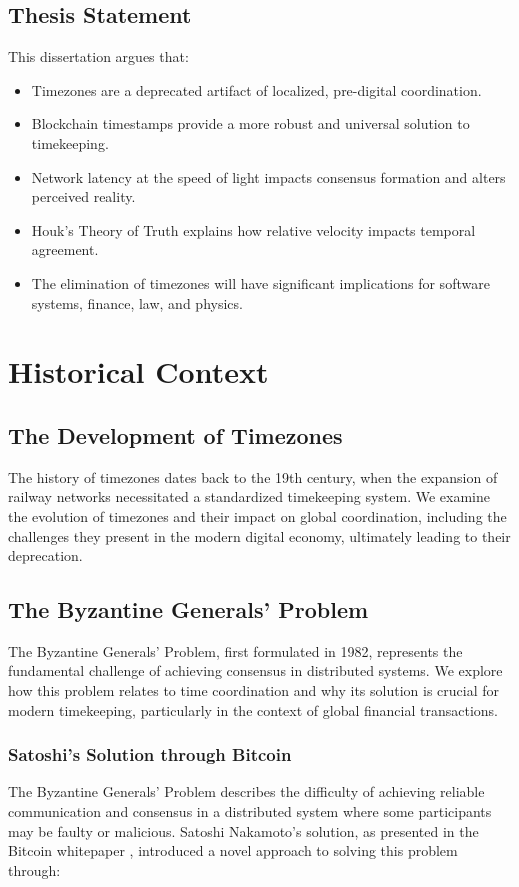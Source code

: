 \documentclass[12pt]{report}
\begin{document}
\section{Thesis Statement}
This dissertation argues that:
\begin{itemize}
    \item Timezones are a deprecated artifact of localized, pre-digital coordination.
    \item Blockchain timestamps provide a more robust and universal solution to timekeeping.
    \item Network latency at the speed of light impacts consensus formation and alters perceived reality.
    \item Houk's Theory of Truth explains how relative velocity impacts temporal agreement.
    \item The elimination of timezones will have significant implications for software systems, finance, law, and physics.
\end{itemize}

\chapter{Historical Context}

\section{The Development of Timezones}
The history of timezones dates back to the 19th century, when the expansion of railway networks necessitated a standardized timekeeping system. We examine the evolution of timezones and their impact on global coordination, including the challenges they present in the modern digital economy, ultimately leading to their deprecation.

\section{The Byzantine Generals' Problem}
The Byzantine Generals' Problem, first formulated in 1982, represents the fundamental challenge of achieving consensus in distributed systems. We explore how this problem relates to time coordination and why its solution is crucial for modern timekeeping, particularly in the context of global financial transactions.

\subsection{Satoshi's Solution through Bitcoin}
The Byzantine Generals' Problem describes the difficulty of achieving reliable communication and consensus in a distributed system where some participants may be faulty or malicious. Satoshi Nakamoto's solution, as presented in the Bitcoin whitepaper \cite{Nakamoto2008}, introduced a novel approach to solving this problem through:
\end{document}
